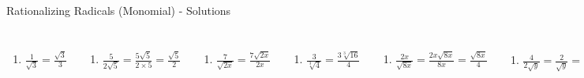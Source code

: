 \documentclass[aspectratio=169]{beamer}
\begin{document}
\begin{frame}{Rationalizing Radicals (Monomial) - Solutions}
\begin{tcolorbox}[colback=lightgray,colframe=primary,title=Solutions]
\footnotesize
\begin{columns}[T]
\begin{enumerate}[label=3\textbf{a})]
  \item $\frac{1}{\sqrt{3}} = \frac{\sqrt{3}}{3}$
\end{enumerate}
\begin{enumerate}[label=3\textbf{b})]
  \item $\frac{5}{2\sqrt{5}} = \frac{5\sqrt{5}}{2\times 5} = \frac{\sqrt{5}}{2}$
\end{enumerate}
\begin{enumerate}[label=3\textbf{c})]
  \item $\frac{7}{\sqrt{2x}} = \frac{7\sqrt{2x}}{2x}$
\end{enumerate}
\begin{enumerate}[label=3\textbf{d})]
  \item $\frac{3}{\sqrt[3]{4}} = \frac{3\sqrt[3]{16}}{4}$
\end{enumerate}
\begin{enumerate}[label=3\textbf{e})]
  \item $\frac{2x}{\sqrt{8x}} = \frac{2x\sqrt{8x}}{8x} = \frac{\sqrt{8x}}{4}$
\end{enumerate}
\begin{enumerate}[label=3\textbf{f})]
  \item $\frac{4}{2\sqrt{y}} = \frac{2}{\sqrt{y}} = \frac{2\sqrt{y}}{y}$
\end{enumerate}
\end{columns}
\end{tcolorbox}
\end{frame}
\end{document}

